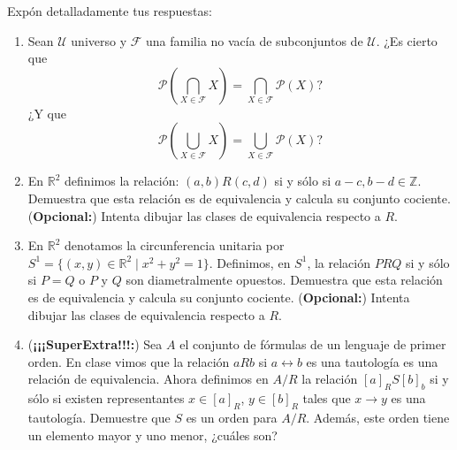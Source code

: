 \documentclass[11pt,answers]{exam}
\begin{document}


Expón detalladamente tus respuestas:

\begin{enumerate}
    \item Sean \( \mathscr{U} \) universo y \( \mathscr{F} \) una familia no vacía de subconjuntos de \( \mathscr{U} \). ¿Es cierto que 
    \[
    \mathscr{P} \left( \bigcap_{X \in \mathscr{F}} X \right) = \bigcap_{X \in \mathscr{F}} \mathscr{P}(X)?
    \]
    ¿Y que 
    \[
    \mathscr{P} \left( \bigcup_{X \in \mathscr{F}} X \right) = \bigcup_{X \in \mathscr{F}} \mathscr{P}(X)?
    \]

    
    
    \item En \( \mathbb{R}^2 \) definimos la relación: \( (a, b) R (c, d) \) si y sólo si \( a - c, b - d \in \mathbb{Z} \). Demuestra que esta relación es de equivalencia y calcula su conjunto cociente. (\textbf{Opcional:}) Intenta dibujar las clases de equivalencia respecto a \( R \).

    
    
    \item En \( \mathbb{R}^2 \) denotamos la circunferencia unitaria por \( S^1 = \{(x, y) \in \mathbb{R}^2 \mid x^2 + y^2 = 1\} \). Definimos, en \( S^1 \), la relación \( P R Q \) si y sólo si \( P = Q \) o \( P \) y \( Q \) son diametralmente opuestos. Demuestra que esta relación es de equivalencia y calcula su conjunto cociente. (\textbf{Opcional:}) Intenta dibujar las clases de equivalencia respecto a \( R \).

    

    \item (\textbf{¡¡¡SuperExtra!!!:}) Sea \( A \) el conjunto de fórmulas de un lenguaje de primer orden. En clase vimos que la relación \( a R b \) si \( a \leftrightarrow b \) es una tautología es una relación de equivalencia. Ahora definimos en \( A/R \) la relación \( [a]_R S[b]_b \) si y sólo si existen representantes \( x \in [a]_R \), \( y \in [b]_R \) tales que \( x \rightarrow y \) es una tautología. Demuestre que \( S \) es un orden para \( A/R \). Además, este orden tiene un elemento mayor y uno menor, ¿cuáles son?

    
\end{enumerate}
\end{document}
